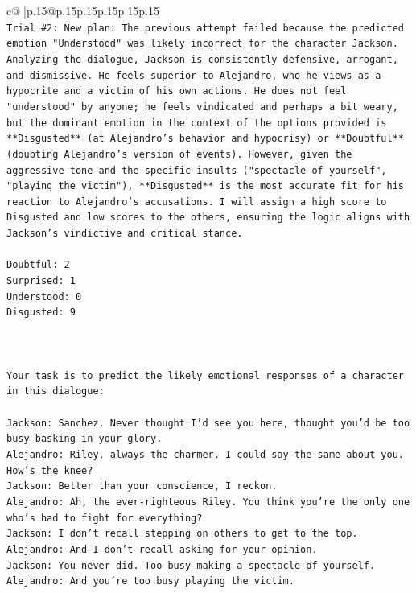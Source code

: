 \documentclass{article}
\begin{document}
{\begin{supertabular}{c@{$\;$}|p{.15\linewidth}@{}p{.15\linewidth}p{.15\linewidth}p{.15\linewidth}p{.15\linewidth}p{.15\linewidth}}
{{{\\ 
\texttt{Trial \#2: New plan: The previous attempt failed because the predicted emotion "Understood" was likely incorrect for the character Jackson. Analyzing the dialogue, Jackson is consistently defensive, arrogant, and dismissive. He feels superior to Alejandro, who he views as a hypocrite and a victim of his own actions. He does not feel "understood" by anyone; he feels vindicated and perhaps a bit weary, but the dominant emotion in the context of the options provided is **Disgusted** (at Alejandro's behavior and hypocrisy) or **Doubtful** (doubting Alejandro's version of events). However, given the aggressive tone and the specific insults ("spectacle of yourself", "playing the victim"), **Disgusted** is the most accurate fit for his reaction to Alejandro's accusations. I will assign a high score to Disgusted and low scores to the others, ensuring the logic aligns with Jackson's vindictive and critical stance.} \\
\\ 
\texttt{Doubtful: 2} \\
\texttt{Surprised: 1} \\
\texttt{Understood: 0} \\
\texttt{Disgusted: 9} \\
\\ 
\\ 
\\ 
\texttt{Your task is to predict the likely emotional responses of a character in this dialogue:} \\
\\ 
\texttt{Jackson: Sanchez. Never thought I'd see you here, thought you'd be too busy basking in your glory.} \\
\texttt{Alejandro: Riley, always the charmer. I could say the same about you. How's the knee?} \\
\texttt{Jackson: Better than your conscience, I reckon.} \\
\texttt{Alejandro: Ah, the ever{-}righteous Riley. You think you're the only one who's had to fight for everything?} \\
\texttt{Jackson: I don't recall stepping on others to get to the top.} \\
\texttt{Alejandro: And I don't recall asking for your opinion.} \\
\texttt{Jackson: You never did. Too busy making a spectacle of yourself.} \\
\texttt{Alejandro: And you're too busy playing the victim. } \\
}}}
\end{supertabular}}
\end{document}
